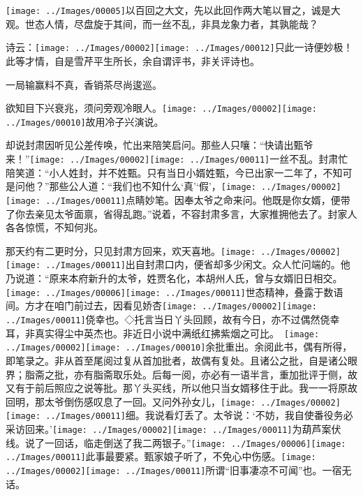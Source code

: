 {\texttt{[image: ../Images/00005]}{\kaishu 以百回之大文，先以此回作两大笔以冒之，诚是大观。世态人情，尽盘旋于其间，而一丝不乱，非具龙象力者，其孰能哉？}%

诗云：{\texttt{[image: ../Images/00002]}\texttt{[image: ../Images/00012]}\footnotesize \kaishu 只此一诗便妙极！此等才情，自是雪芹平生所长，余自谓评书，非关评诗也。}

一局输赢料不真，香销茶尽尚逡巡。

欲知目下兴衰兆，须问旁观冷眼人。{\texttt{[image: ../Images/00002]}\texttt{[image: ../Images/00010]}\footnotesize \kaishu 故用冷子兴演说。}

却说封肃因听见公差传唤，忙出来陪笑启问。那些人只嚷：``快请出甄爷来！''{\texttt{[image: ../Images/00002]}\texttt{[image: ../Images/00011]}\footnotesize \kaishu 一丝不乱。}封肃忙陪笑道：``小人姓封，并不姓甄。只有当日小婿姓甄，今已出家一二年了，不知可是问他？''那些公人道：``我们也不知什么`真'`假'，{\texttt{[image: ../Images/00002]}\texttt{[image: ../Images/00011]}\footnotesize \kaishu 点睛妙笔。}因奉太爷之命来问。他既是你女婿，便带了你去亲见太爷面禀，省得乱跑。''说着，不容封肃多言，大家推拥他去了。封家人各各惊慌，不知何兆。

那天约有二更时分，只见封肃方回来，欢天喜地。{\texttt{[image: ../Images/00002]}\texttt{[image: ../Images/00011]}\footnotesize \kaishu 出自封肃口内，便省却多少闲文。}众人忙问端的。他乃说道：``原来本府新升的太爷，姓贾名化，本胡州人氏，曾与女婿旧日相交。{\texttt{[image: ../Images/00006]}\texttt{[image: ../Images/00011]}\footnotesize \kaishu 世态精神，叠露于数语间。}方才在咱门前过去，因看见娇杏{\texttt{[image: ../Images/00002]}\texttt{[image: ../Images/00011]}\footnotesize \kaishu 侥幸也。◇托言当日丫头回顾，故有今日，亦不过偶然侥幸耳，非真实得尘中英杰也。非近日小说中满纸红拂紫烟之可比。　\texttt{[image: ../Images/00002]}\texttt{[image: ../Images/00010]}\footnotesize \kaishu 余批重出。余阅此书，偶有所得，即笔录之。非从首至尾阅过复从首加批者，故偶有复处。且诸公之批，自是诸公眼界；脂斋之批，亦有脂斋取乐处。后每一阅，亦必有一语半言，重加批评于侧，故又有于前后照应之说等批。}那丫头买线，所以他只当女婿移住于此。我一一将原故回明，那太爷倒伤感叹息了一回。又问外孙女儿，{\texttt{[image: ../Images/00002]}\texttt{[image: ../Images/00011]}\footnotesize \kaishu 细。}我说看灯丢了。太爷说：`不妨，我自使番役务必采访回来。'{\texttt{[image: ../Images/00002]}\texttt{[image: ../Images/00011]}\footnotesize \kaishu 为葫芦案伏线。}说了一回话，临走倒送了我二两银子。''{\texttt{[image: ../Images/00006]}\texttt{[image: ../Images/00011]}\footnotesize \kaishu 此事最要紧。}甄家娘子听了，不免心中伤感。{\texttt{[image: ../Images/00002]}\texttt{[image: ../Images/00011]}\footnotesize \kaishu 所谓``旧事凄凉不可闻''也。}一宿无话。

}
